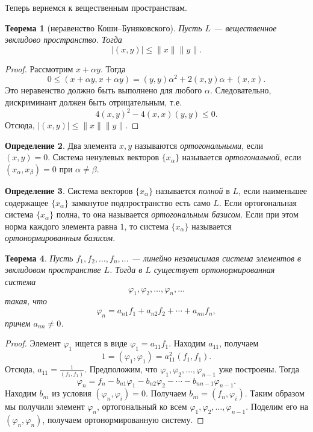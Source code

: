\documentclass[12pt, titlepage, oneside]{amsbook}
\newtheorem{theorem}{Теорема}[chapter]
\theoremstyle{definition}
\newtheorem{definition}[theorem]{Определение}
\theoremstyle{remark}
\begin{document}
Теперь вернемся к вещественным пространствам.

\begin{theorem}[неравенство Коши--Буняковского]
	\label{Ev1}
	Пусть $L$ --- вещественное эвклидово пространство. Тогда $$|(x,y)|\leq\|x\| \|y\|.$$
\end{theorem}


\begin{proof}
	Рассмотрим $x+\alpha y$. Тогда $$0\leq (x+\alpha y,x+\alpha y)=(y,y)\alpha^2+2(x,y)\alpha+(x,x).$$ Это неравенство должно быть выполнено для любого $\alpha$. Следовательно, дискриминант должен быть отрицательным, т.е. $$4(x,y)^2-4(x,x)(y,y)\leq 0.$$ Отсюда, $|(x,y)|\leq\|x\| \|y\|.$
\end{proof}

\begin{definition}
	Два элемента $x,y$ называются \emph{ортогональными}, если $(x,y)=0$. Система ненулевых векторов $\{x_{\alpha}\}$ называется \emph{ортогональной}, если $(x_{\alpha},x_{\beta})=0$ при $\alpha\neq\beta$.
\end{definition}

\begin{definition}
	Система векторов $\{x_{\alpha}\}$ называется \emph{полной} в $L$, если наименьшее содержащее $\{x_{\alpha}\}$ замкнутое подпространство есть само $L$. Если ортогональная система $\{x_{\alpha}\}$ полна, то она называется \emph{ортогональным базисом}. Если при этом норма каждого элемента равна $1$, то система $\{x_{\alpha}\}$ называется \emph{ортонормированным базисом}.
\end{definition}

\begin{theorem}
	\label{Ev2}
	Пусть $f_1,f_2,\ldots, f_n,\ldots$ --- линейно независимая система элементов в эвклидовом пространстве $L$. Тогда в $L$ существует ортонормированная система $$\varphi_1, \varphi_2,\ldots, \varphi_n,\ldots$$ такая, что $$\varphi_n=a_{n1}f_1+a_{n2}f_2+\cdots+a_{nn}f_n,$$ причем $a_{nn}\neq 0$.
\end{theorem}

\begin{proof}
	Элемент $\varphi_1$ ищется в виде $\varphi_1=a_{11} f_1$. Находим $a_{11}$, получаем $$1=(\varphi_1,\varphi_1)=a_{11}^2(f_1,f_1).$$ Отсюда, $a_{11}=\frac{1}{(f_1,f_1)}$. Предположим, что $\varphi_1, \varphi_2,\ldots, \varphi_{n-1}$ уже построены. Тогда $$\varphi_n=f_n-b_{n1}\varphi_1-b_{n2}\varphi_2-\cdots-b_{n n-1}\varphi_{n-1}.$$ Находим $b_{ni}$ из условия $(\varphi_n,\varphi_i)=0$. Получаем $b_{ni}=(f_n,\varphi_i)$. Таким образом мы получили элемент $\varphi_n$, ортогональный ко всем $\varphi_1, \varphi_2,\ldots, \varphi_{n-1}$. Поделим его на $(\varphi_n,\varphi_n)$, получаем ортонормированную систему.
\end{proof}
\end{document}
